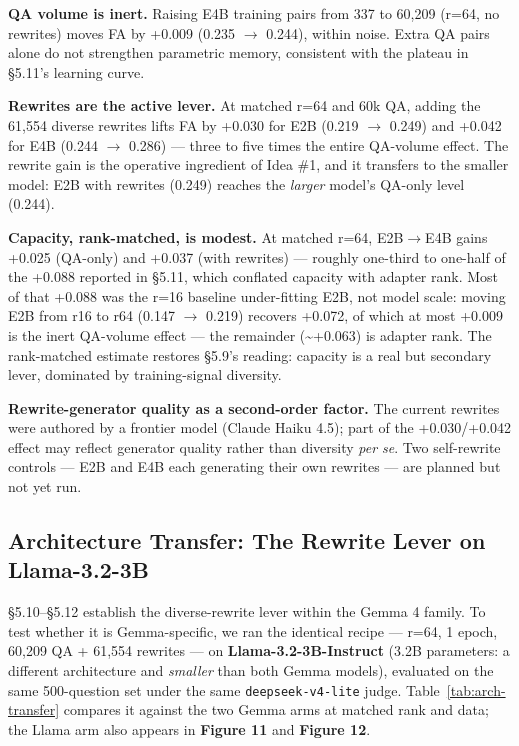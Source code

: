 \documentclass[10pt,twocolumn]{article}
\begin{document}
\textbf{QA volume is inert.} Raising E4B training pairs from 337 to 60,209 (r=64, no rewrites) moves FA by +0.009 (0.235 $\to$ 0.244), within noise. Extra QA pairs alone do not strengthen parametric memory, consistent with the plateau in \S{}5.11's learning curve.


\textbf{Rewrites are the active lever.} At matched r=64 and 60k QA, adding the 61,554 diverse rewrites lifts FA by +0.030 for E2B (0.219 $\to$ 0.249) and +0.042 for E4B (0.244 $\to$ 0.286) --- three to five times the entire QA-volume effect. The rewrite gain is the operative ingredient of Idea \#1, and it transfers to the smaller model: E2B with rewrites (0.249) reaches the \textit{larger} model's QA-only level (0.244).


\textbf{Capacity, rank-matched, is modest.} At matched r=64, E2B$\to$E4B gains +0.025 (QA-only) and +0.037 (with rewrites) --- roughly one-third to one-half of the +0.088 reported in \S{}5.11, which conflated capacity with adapter rank. Most of that +0.088 was the r=16 baseline under-fitting E2B, not model scale: moving E2B from r16 to r64 (0.147 $\to$ 0.219) recovers +0.072, of which at most +0.009 is the inert QA-volume effect --- the remainder (\textasciitilde{}+0.063) is adapter rank. The rank-matched estimate restores \S{}5.9's reading: capacity is a real but secondary lever, dominated by training-signal diversity.


\textbf{Rewrite-generator quality as a second-order factor.} The current rewrites were authored by a frontier model (Claude Haiku 4.5); part of the +0.030/+0.042 effect may reflect generator quality rather than diversity \textit{per se}. Two self-rewrite controls --- E2B and E4B each generating their own rewrites --- are planned but not yet run.


\subsection{Architecture Transfer: The Rewrite Lever on Llama-3.2-3B}

\S{}5.10--\S{}5.12 establish the diverse-rewrite lever within the Gemma 4 family. To test whether it is Gemma-specific, we ran the identical recipe --- r=64, 1 epoch, 60,209 QA + 61,554 rewrites --- on \textbf{Llama-3.2-3B-Instruct} (3.2B parameters: a different architecture and \textit{smaller} than both Gemma models), evaluated on the same 500-question set under the same \texttt{deepseek-v4-lite} judge. Table~\ref{tab:arch-transfer} compares it against the two Gemma arms at matched rank and data; the Llama arm also appears in \textbf{Figure 11} and \textbf{Figure 12}.
\end{document}
